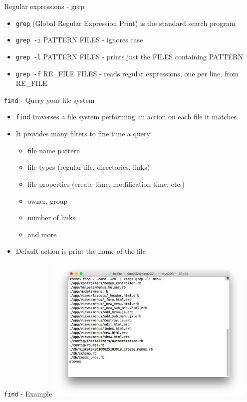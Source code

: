 \documentclass[t]{beamer}
\begin{document}
\begin{frame}{Regular expressions - grep}
  \begin{itemize}
  \item \texttt{grep} (Global Regular Expression Print) is the standard search
    program
  \item \texttt{grep -i} PATTERN FILES - ignores case
  \item \texttt{grep -l} PATTERN FILES - prints just the FILES containing
    PATTERN
  \item \texttt{grep -f} RE\_FILE FILES - reads regular expressions, one per
    line, from RE\_FILE
  \end{itemize}
  \note{}
\end{frame}

\begin{frame}{\texttt{find} - Query your file system}
  \begin{itemize}
  \item \texttt{find} traverses a file system performing an action on each file it matches
  \item It provides many filters to fine tune a query:
    \begin{itemize}
    \item file name pattern
    \item file types (regular file, directories, links)
    \item file properties (create time, modification time, etc.)
    \item owner, group
    \item number of links
    \item and more
    \end{itemize}
  \item Default action is print the name of the file
  \end{itemize}
  \note{}
\end{frame}

\begin{frame}{\texttt{find} - Example}
  \includegraphics[width=10cm,scale=0.4]{images/find.png}
  \note{}
\end{frame}
\end{document}
